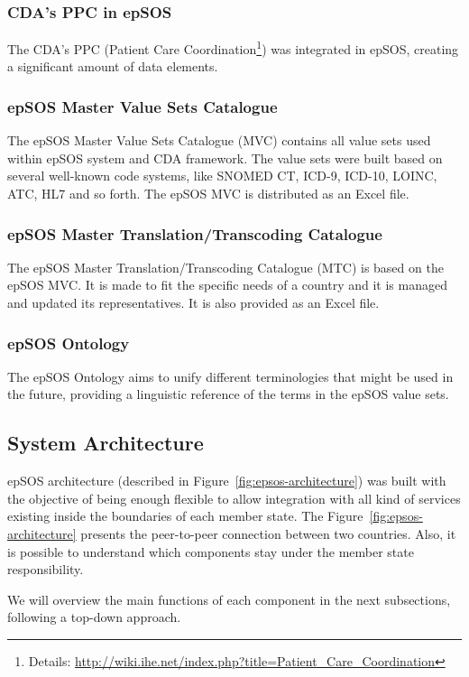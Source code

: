 \subsubsection{CDA's PPC in epSOS}
The CDA's PPC (Patient Care Coordination\footnote{Details: \url{http://wiki.ihe.net/index.php?title=Patient_Care_Coordination}}) was integrated in epSOS, creating a significant amount of data elements.

\subsubsection{epSOS Master Value Sets Catalogue}
The epSOS Master Value Sets Catalogue (MVC) contains all value sets used within epSOS system and CDA framework. The value sets were built based on several well-known code systems, like SNOMED CT, ICD-9, ICD-10, LOINC, ATC, HL7 and so forth. The epSOS MVC is distributed as an Excel file.

\subsubsection{epSOS Master Translation/Transcoding Catalogue}
The epSOS Master Translation/Transcoding Catalogue (MTC) is based on the epSOS MVC. It is made to fit the specific needs of a country and it is managed and updated its representatives. It is also provided as an Excel file.

\subsubsection{epSOS Ontology}
The epSOS Ontology aims to unify different terminologies that might be used in the future, providing a linguistic reference of the terms in the epSOS value sets.



\subsection{System Architecture}

epSOS architecture (described in Figure~\ref{fig:epsos-architecture}) was built with the objective of being enough flexible to allow integration with all kind of services existing inside the boundaries of each member state. The Figure~\ref{fig:epsos-architecture} presents the peer-to-peer connection between two countries. Also, it is possible to understand which components stay under the member state responsibility.

We will overview the main functions of each component in the next subsections, following a top-down approach.


